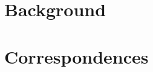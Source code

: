 \documentclass[12pt,a4paper,fleqn]{article}
\theoremstyle{definition}
\theoremstyle{plain}
\theoremstyle{plain}
\theoremstyle{definition}
\begin{document}
\newpage
\tableofcontents



\newpage
\section{Background}




\newpage
\section{Correspondences}





\newpage


\nocite{*}
\end{document}
